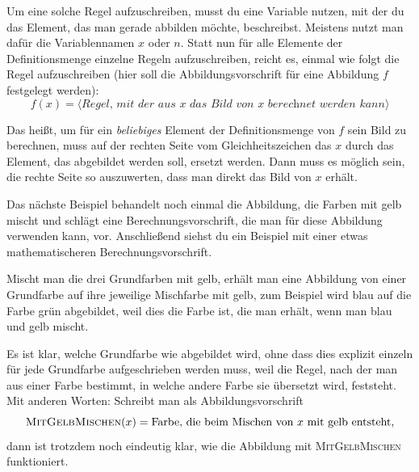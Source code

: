 \documentclass[../../main.tex]{subfiles}
\begin{document}
Um eine solche Regel aufzuschreiben, musst du eine Variable nutzen, mit der du das Element, das man gerade abbilden möchte, beschreibst. Meistens nutzt man dafür die Variablennamen $x$ oder $n$. Statt nun für alle Elemente der Definitionsmenge einzelne Regeln aufzuschreiben, reicht es, einmal wie folgt die Regel aufzuschreiben (hier soll die Abbildungsvorschrift für eine Abbildung $f$ festgelegt werden): 
\[f(x)=\langle\textit{Regel, mit der aus $x$ das Bild von $x$ berechnet werden kann}\rangle\]

Das heißt, um für ein \emph{beliebiges} Element der Definitionsmenge von $f$ sein Bild zu berechnen, muss auf der rechten Seite vom Gleichheitszeichen das $x$ durch das Element, das abgebildet werden soll, ersetzt werden. Dann muss es möglich sein, die rechte Seite so auszuwerten, dass man direkt das Bild von $x$ erhält.

Das nächste Beispiel behandelt noch einmal die Abbildung, die Farben mit gelb mischt und schlägt eine Berechnungsvorschrift, die man für diese Abbildung verwenden kann, vor. Anschließend siehst du ein Beispiel mit einer etwas mathematischeren Berechnungsvorschrift.

\begin{example}{}
    \parpic[r]{
    }
    
    Mischt man die drei Grundfarben mit gelb, erhält man eine Abbildung von einer Grundfarbe auf ihre jeweilige Mischfarbe mit gelb, zum Beispiel wird blau auf die Farbe grün abgebildet, weil dies die Farbe ist, die man erhält, wenn man blau und gelb mischt.
    
    Es ist klar, welche Grundfarbe wie abgebildet wird, ohne dass dies explizit einzeln für jede Grundfarbe aufgeschrieben werden muss, weil die Regel, nach der man aus einer Farbe bestimmt, in welche andere Farbe sie übersetzt wird, feststeht. Mit anderen Worten: Schreibt man als Abbildungsvorschrift
    \[\textsc{MitGelbMischen}(x)=\text{Farbe, die beim Mischen von } x \text{ mit gelb entsteht},\]
    dann ist trotzdem noch eindeutig klar, wie die Abbildung mit \textsc{MitGelbMischen} funktioniert.
\end{example}
\end{document}
